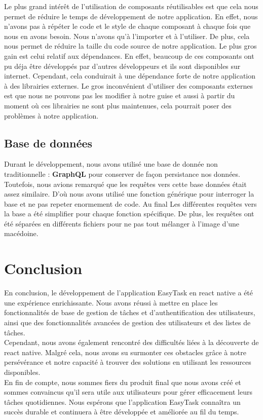 \documentclass[12pt]{article}
\begin{document}
        Le plus grand intérêt de l'utilisation de composants réutilisables est que cela nous permet de réduire le temps de développement
        de notre application. En effet, nous n'avons pas à répéter le code et le style de chaque composant à chaque fois que nous en avons besoin.
        Nous n'avons qu'à l'importer et à l'utiliser. De plus, cela nous permet de réduire la taille du code source de notre application. Le plus
        gros gain est celui relatif aux dépendances. En effet, beaucoup de ces composants ont pu déja être développés par d'autres
        développeurs et ils sont disponibles sur internet. Cependant, cela conduirait à une dépendance forte de notre application à des librairies
        externes. Le gros inconvénient d'utiliser des composants externes est que nous ne pouvons pas les modifier à notre guise et
        aussi à partir du moment où ces librairies ne sont plus maintenues, cela pourrait poser des problèmes à notre application.

        \subsection{Base de données}
        Durant le développement, nous avons utilisé une base de donnée non traditionnelle : \textbf{GraphQL} pour conserver
        de façon persistance nos données. Toutefois, nous avions remarqué que les requêtes vers cette base données était assez similaire.
        D'où nous avons utilisé une fonction générique pour interroger la base et ne pas repeter enormement de code. Au final
        Les différentes requêtes vers la base a été simplifier pour chaque fonction spécifique. De plus, les requêtes ont
        été séparées en différents fichiers pour ne pas tout mélanger à l'image d'une macédoine.

        \section{Conclusion}\label{sec:conclusion}
        En conclusion, le développement de l'application EasyTask en react native a été une expérience enrichissante.
        Nous avons réussi à mettre en place les fonctionnalités de base de gestion de tâches et d'authentification des utilisateurs,
        ainsi que des fonctionnalités avancées de gestion des utilisateurs et des listes de tâches.\\

        Cependant, nous avons également rencontré des difficultés liées à la découverte de react native. Malgré cela,
        nous avons su surmonter ces obstacles grâce à notre persévérance et notre capacité à trouver des solutions en
        utilisant les ressources disponibles.\\

        En fin de compte, nous sommes fiers du produit final que nous avons créé et sommes convaincus qu'il sera utile
        aux utilisateurs pour gérer efficacement leurs tâches quotidiennes. Nous espérons que l'application EasyTask
        connaîtra un succès durable et continuera à être développée et améliorée au fil du temps.
        \newpage
        \listoffigures
\end{document}
